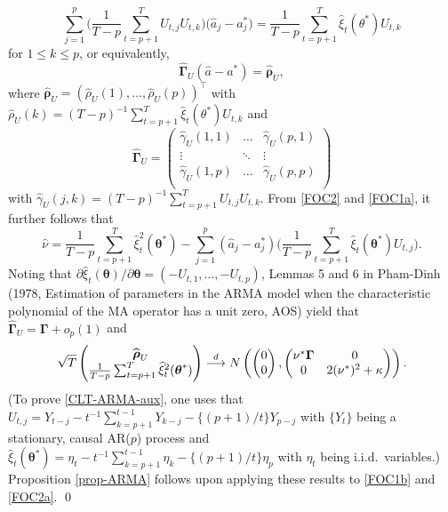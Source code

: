 \documentclass[a4paper,12pt]{article}
\begin{document}
\begin{equation}\label{FOC1a}
\sum_{j=1}^p \Big( \frac{1}{T-p} \sum_{t=p+1}^T U_{t,j} U_{t,k} \Big) \big( \widehat{a}_j - a_j^* \big) = \frac{1}{T-p} \sum\limits_{t=p+1}^T \widehat{\xi}_t(\theta^*) U_{t,k} 
\end{equation}
for $1 \le k \le p$, or equivalently, 
\begin{equation}\label{FOC1b} 
\widehat{\boldsymbol{\Gamma}}_U ( \widehat{a} - a^*) = \widehat{\boldsymbol{\rho}}_U,
\end{equation}
where $\widehat{\boldsymbol{\rho}}_U = (\widehat{\rho}_U(1),\ldots,\widehat{\rho}_U(p))^\top$ with $\widehat{\rho}_U(k) = (T-p)^{-1} \sum_{t=p+1}^T \widehat{\xi}_t(\theta^*) U_{t,k}$ and  
\[ \widehat{\boldsymbol{\Gamma}}_U =
\begin{pmatrix} 
\widehat{\gamma}_U(1,1) & \dots  & \widehat{\gamma}_U(p,1) \\
\vdots      & \ddots & \vdots      \\
\widehat{\gamma}_U(1,p) & \dots  & \widehat{\gamma}_U(p,p) \\
\end{pmatrix} 
\]
with $\widehat{\gamma}_U(j,k) = (T-p)^{-1} \sum_{t=p+1}^T U_{t,j} U_{t,k}$. From \eqref{FOC2} and \eqref{FOC1a}, it further follows that
\begin{equation}\label{FOC2a}
\widehat{\nu} = \frac{1}{T-p} \sum\limits_{t=p+1}^T \widehat{\xi}_t^2(\boldsymbol{\theta}^*) - \sum\limits_{j=1}^p (\widehat{a}_j - a_j^*) \Big( \frac{1}{T-p} \sum\limits_{t=p+1}^T \widehat{\xi}_t(\boldsymbol{\theta}^*) U_{t,j} \Big).
\end{equation}
Noting that $\partial \widehat{\xi}_t(\boldsymbol{\theta})/ \partial \boldsymbol{\theta} = (-U_{t,1},\ldots,-U_{t,p})$, Lemmas 5 and 6 in Pham-Dinh (1978, Estimation of parameters in the ARMA model when the characteristic polynomial of the MA operator has a unit zero, AOS) yield that $\widehat{\boldsymbol{\Gamma}}_U = \boldsymbol{\Gamma} + o_p(1)$ and
\begin{equation}\label{CLT-ARMA-aux}
\sqrt{T} \begin{pmatrix} \widehat{\boldsymbol{\rho}}_U \\ \frac{1}{T-p} \sum_{t=p+1}^T \widehat{\xi}_t^2(\boldsymbol{\theta}^*) \end{pmatrix} \stackrel{d}{\longrightarrow} N \left( \begin{pmatrix} 0 \\ 0 \end{pmatrix}, \begin{pmatrix} \nu^* \boldsymbol{\Gamma} & 0 \\ 0 & 2 (\nu^*)^2 + \kappa \end{pmatrix} \right). 
\end{equation}
(To prove \eqref{CLT-ARMA-aux}, one uses that $U_{t,j} = Y_{t-j} - t^{-1} \sum_{k=p+1}^{t-1} Y_{k-j} - \{(p+1)/t\} Y_{p-j}$ with $\{Y_t\}$ being a stationary, causal AR($p$) process and $\widehat{\xi}_t(\boldsymbol{\theta}^*) = \eta_t - t^{-1} \sum_{k=p+1}^{t-1} \eta_k - \{(p+1)/t\} \eta_p$ with $\eta_t$ being i.i.d.\ variables.) Proposition \ref{prop-ARMA} follows upon applying these results to \eqref{FOC1b} and \eqref{FOC2a}. \qed
\end{document}
